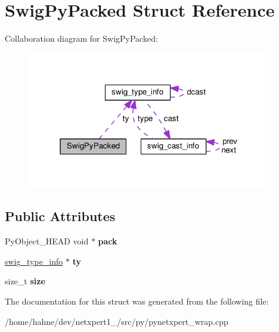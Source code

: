 \hypertarget{structSwigPyPacked}{}\section{Swig\+Py\+Packed Struct Reference}
\label{structSwigPyPacked}


Collaboration diagram for Swig\+Py\+Packed\+:\nopagebreak
\begin{figure}[H]
\begin{center}
\leavevmode
\includegraphics[width=304pt]{structSwigPyPacked__coll__graph}
\end{center}
\end{figure}
\subsection*{Public Attributes}
\begin{DoxyCompactItemize}
\item 
Py\+Object\+\_\+\+H\+E\+AD void $\ast$ {\bfseries pack}\hypertarget{structSwigPyPacked_af5122bcb9e73bf2dec4ce5f58f004e1b}{}\label{structSwigPyPacked_af5122bcb9e73bf2dec4ce5f58f004e1b}

\item 
\hyperlink{structswig__type__info}{swig\+\_\+type\+\_\+info} $\ast$ {\bfseries ty}\hypertarget{structSwigPyPacked_aa6f6be0a8a1bff7710200fbe8d51acf0}{}\label{structSwigPyPacked_aa6f6be0a8a1bff7710200fbe8d51acf0}

\item 
size\+\_\+t {\bfseries size}\hypertarget{structSwigPyPacked_aed2bfb8fb3c9f804c386215db63921cb}{}\label{structSwigPyPacked_aed2bfb8fb3c9f804c386215db63921cb}

\end{DoxyCompactItemize}


The documentation for this struct was generated from the following file\+:\begin{DoxyCompactItemize}
\item 
/home/hahne/dev/netxpert1\+\_/src/py/pynetxpert\+\_\+wrap.\+cpp\end{DoxyCompactItemize}
